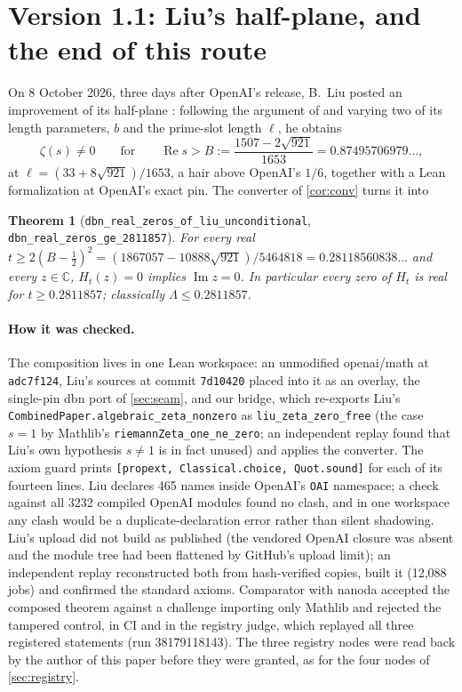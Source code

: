 \documentclass[11pt]{article}
\newtheorem{theorem}{Theorem}
\theoremstyle{definition}
\newcommand{\lean}[1]{\texttt{#1}}
\newcommand{\Lam}{\Lambda}
\newcommand{\Hfun}{H}
\newcommand{\re}{\operatorname{Re}}
\newcommand{\im}{\operatorname{Im}}
\newcommand{\C}{\mathbb{C}}
\begin{document}
\section{Version 1.1: Liu's half-plane, and the end of this route}\label{sec:liu}

On 8 October 2026, three days after OpenAI's release, B.~Liu posted an improvement of its half-plane \cite{Liu}: following the argument of \cite{OAIqrh} and varying two of its length parameters, $b$ and the prime-slot length $\ell$, he obtains
\[
\zeta(s) \ne 0 \qquad\text{for}\qquad \re s > B := \frac{1507 - 2\sqrt{921}}{1653} = 0.87495706979\ldots,
\]
at $\ell = (33 + 8\sqrt{921})/1653$, a hair above OpenAI's $1/6$, together with a Lean formalization at OpenAI's exact pin. The converter of \cref{cor:conv} turns it into
\begin{theorem}[\lean{dbn\_real\_zeros\_of\_liu\_unconditional}, \lean{dbn\_real\_zeros\_ge\_2811857}]\label{thm:liu}
For every real $t \ge 2(B - \tfrac12)^2 = (1867057 - 10888\sqrt{921})/5464818 = 0.28118560838\ldots$ and every $z \in \C$, $\Hfun_t(z) = 0$ implies $\im z = 0$. In particular every zero of $\Hfun_t$ is real for $t \ge 0.2811857$; classically $\Lam \le 0.2811857$.
\end{theorem}

\paragraph{How it was checked.} The composition lives in one Lean workspace: an unmodified openai/math at \lean{adc7f124}, Liu's sources at commit \lean{7d10420} placed into it as an overlay, the single-pin dbn port of \cref{sec:seam}, and our bridge, which re-exports Liu's \lean{CombinedPaper.algebraic\_zeta\_nonzero} as \lean{liu\_zeta\_zero\_free} (the case $s = 1$ by Mathlib's \lean{riemannZeta\_one\_ne\_zero}; an independent replay found that Liu's own hypothesis $s \ne 1$ is in fact unused) and applies the converter. The axiom guard prints \lean{[propext, Classical.choice, Quot.sound]} for each of its fourteen lines. Liu declares 465 names inside OpenAI's \lean{OAI} namespace; a check against all 3232 compiled OpenAI modules found no clash, and in one workspace any clash would be a duplicate-declaration error rather than silent shadowing. Liu's upload did not build as published (the vendored OpenAI closure was absent and the module tree had been flattened by GitHub's upload limit); an independent replay reconstructed both from hash-verified copies, built it (12,088 jobs) and confirmed the standard axioms. Comparator with nanoda accepted the composed theorem against a challenge importing only Mathlib and rejected the tampered control, in CI and in the registry judge, which replayed all three registered statements (run 38179118143). The three registry nodes were read back by the author of this paper before they were granted, as for the four nodes of \cref{sec:registry}.
\end{document}
